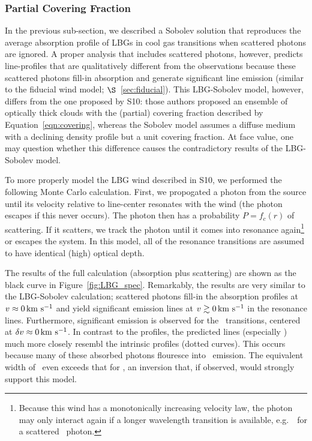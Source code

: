 \documentclass[12pt,preprint]{aastex}
\begin{document}
\subsubsection{Partial Covering Fraction}
\label{sec:Covering}

In the previous sub-section, we described a Sobolev solution that
reproduces the average absorption profile of LBGs in cool gas
transitions when scattered photons are ignored.  A proper analysis
that includes scattered photons,
however, predicts line-profiles that are qualitatively
different from the observations because these scattered photons fill-in
absorption and generate significant line emission (similar to the
fiducial wind model; $\S$~\ref{sec:fiducial}).
This LBG-Sobolev model, however, differs from
the one proposed by S10:  those authors proposed an ensemble of optically
thick clouds with the (partial) covering fraction described by
Equation~\ref{eqn:covering}, whereas the Sobolev model assumes
a diffuse medium with a declining density profile but a unit covering
fraction.  At face value, one may question whether this difference
causes the contradictory results of the LBG-Sobolev model. 

To more properly model the LBG wind described in S10, we 
performed the following Monte Carlo calculation.  First, we propogated
a photon from the source until its velocity relative to line-center
resonates with the wind (the photon escapes if this never occurs).
The photon then has a probability $P = f_c(r)$ of scattering.  If it
scatters, we track the photon until it comes into
resonance again\footnote{Because this wind has a monotonically
  increasing velocity law, the photon may only interact again if a
  longer wavelength transition is available, e.g.\ \mgiib\ for a
  scattered \mgiia\ photon.} or escapes the system.  In this model, all of the
resonance transitions are assumed to have identical (high) optical
depth. 

The results of the full calculation (absorption plus scattering) are
shown as the black curve in Figure~\ref{fig:LBG_spec}.  Remarkably, the results
are very similar to the LBG-Sobolev calculation; scattered photons fill-in
the absorption profiles at $v \approx 0 \, {\rm km~s^{-1}}$ and yield significant
emission lines at $v \gtrsim 0 \, {\rm km~s^{-1}}$ in the resonance
lines. Furthermore, significant emission is observed 
for the \feiis\ transitions, centered at $\delta v \approx 0 \, {\rm km~s^{-1}}$.  
In contrast to the  profiles, the predicted 
lines (especially \feiia) much more closely resembl the intrinsic
profiles (dotted curves).  This occurs because many of these
absorbed photons flouresce into \feiis\ emission.
The equivalent width of \feiia\ even exceeds that for \feiib, an
inversion that, if observed, would strongly support this model.
\end{document}
